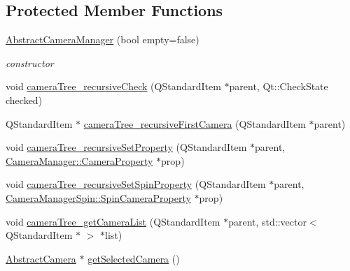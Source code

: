 \subsection*{Protected Member Functions}
\begin{DoxyCompactItemize}
\item 
\mbox{\hyperlink{class_abstract_camera_manager_a23be9d93959d992c91efcf1416c597ef}{Abstract\+Camera\+Manager}} (bool empty=false)
\begin{DoxyCompactList}\small\item\em constructor \end{DoxyCompactList}\item 
void \mbox{\hyperlink{class_abstract_camera_manager_a967471f87b6d538e63f3a8c03d0d68f5}{camera\+Tree\+\_\+recursive\+Check}} (Q\+Standard\+Item $\ast$parent, Qt\+::\+Check\+State checked)
\item 
Q\+Standard\+Item $\ast$ \mbox{\hyperlink{class_abstract_camera_manager_a35d2442e2130462fc4f6f991c36d51f7}{camera\+Tree\+\_\+recursive\+First\+Camera}} (Q\+Standard\+Item $\ast$parent)
\item 
void \mbox{\hyperlink{class_abstract_camera_manager_ab0fdb008fbd46d94899053d1ca671f35}{camera\+Tree\+\_\+recursive\+Set\+Property}} (Q\+Standard\+Item $\ast$parent, \mbox{\hyperlink{class_camera_manager_1_1_camera_property}{Camera\+Manager\+::\+Camera\+Property}} $\ast$prop)
\item 
void \mbox{\hyperlink{class_abstract_camera_manager_a28adef627215413716f8a301330055c9}{camera\+Tree\+\_\+recursive\+Set\+Spin\+Property}} (Q\+Standard\+Item $\ast$parent, \mbox{\hyperlink{class_camera_manager_spin_1_1_spin_camera_property}{Camera\+Manager\+Spin\+::\+Spin\+Camera\+Property}} $\ast$prop)
\item 
void \mbox{\hyperlink{class_abstract_camera_manager_a81a5dd1be751723f195ac6269891ed3f}{camera\+Tree\+\_\+get\+Camera\+List}} (Q\+Standard\+Item $\ast$parent, std\+::vector$<$ Q\+Standard\+Item $\ast$ $>$ $\ast$list)
\item 
\mbox{\hyperlink{class_abstract_camera}{Abstract\+Camera}} $\ast$ \mbox{\hyperlink{class_abstract_camera_manager_a4bcb266a61c634e5f65a653f217f994c}{get\+Selected\+Camera}} ()
\end{DoxyCompactItemize}
